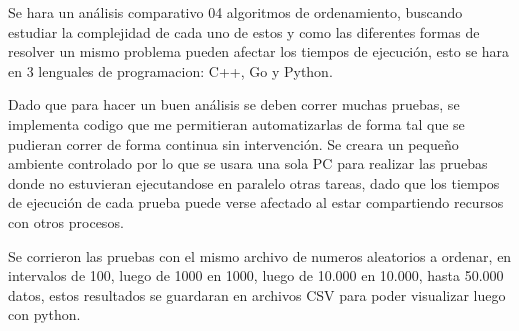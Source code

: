 \documentclass{article}
\begin{document}
	Se hara un análisis comparativo 04 algoritmos de ordenamiento, buscando estudiar la complejidad de cada uno de estos y como las diferentes formas de resolver un mismo problema pueden afectar los tiempos de ejecución, esto se hara en 3 lenguales de programacion: C++, Go y Python.
	
	Dado que para hacer un buen análisis se deben correr muchas pruebas, se implementa codigo que me permitieran automatizarlas de forma tal que se pudieran correr de forma continua sin intervención. Se creara un pequeño ambiente controlado por lo que se usara una sola PC para realizar las pruebas donde no estuvieran ejecutandose en paralelo otras tareas, dado que los tiempos de ejecución de cada prueba puede verse afectado al estar compartiendo recursos con otros procesos.

    Se corrieron las pruebas con el mismo archivo de numeros aleatorios a ordenar, en intervalos de 100, luego de 1000 en 1000, luego de 10.000 en 10.000, hasta 50.000 datos, estos resultados se guardaran en archivos CSV para poder visualizar luego con python.
	

	
\end{document}
